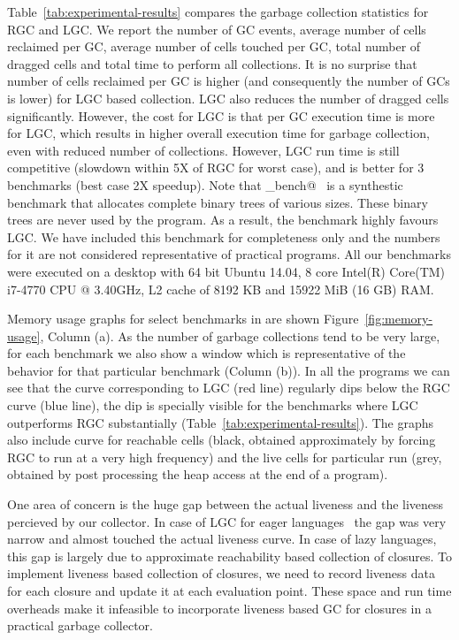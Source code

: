 \documentclass[9pt]{sigplanconf}
\begin{document}
Table~\ref{tab:experimental-results}  compares the  garbage collection
statistics  for RGC  and  LGC.  We  report the  number  of GC  events,
average  number of  cells reclaimed  per GC,  average number  of cells
touched  per GC,  total  number of  dragged cells  and  total time  to
perform  all collections.   It is  no  surprise that  number of  cells
reclaimed per  GC is  higher (and  consequently the  number of  GCs is
lower)  for LGC  based collection.   LGC  also reduces  the number  of
dragged cells significantly. However, the cost  for LGC is that per GC
execution  time is  more  for  LGC, which  results  in higher  overall
execution time  for garbage  collection, even  with reduced  number of
collections.   However, LGC  run time  is still  competitive (slowdown
within 5X of RGC for worst case), and is better for 3 benchmarks (best
case  2X speedup).   Note  that  \verb@gc_bench@~\cite{gc_bench} is  a
synthestic benchmark  that allocates complete binary  trees of various
sizes.  These binary trees are never used by the program. As a result,
the benchmark highly favours LGC.  We have included this benchmark for
completeness  only  and   the  numbers  for  it   are  not  considered
representative of practical programs. All our benchmarks were executed
on  a desktop  with  64 bit  Ubuntu 14.04,  8  core Intel(R)  Core(TM)
i7-4770 CPU @ 3.40GHz, L2 cache of 8192 KB and 15922 MiB (16 GB) RAM.

Memory   usage   graphs   for   select   benchmarks   in   are   shown
Figure~\ref{fig:memory-usage}, Column  (a).  As the number  of garbage
collections tend to  be very large, for each benchmark  we also show a
window which  is representative  of the  behavior for  that particular
benchmark (Column (b)).  In all the programs we can see that the curve
corresponding to  LGC (red  line) regularly dips  below the  RGC curve
(blue line), the dip is specially visible for the benchmarks where LGC
outperforms                      RGC                     substantially
(Table~\ref{tab:experimental-results}). The graphs  also include curve
for reachable cells  (black, obtained approximately by  forcing RGC to
run at  a very high frequency)  and the live cells  for particular run
(grey, obtained  by post processing  the heap access  at the end  of a
program).

One area  of concern is the  huge gap between the  actual liveness and
the liveness  percieved by our  collector.  In  case of LGC  for eager
languages~\cite{asati14lgc} the gap was  very narrow and almost touched
the actual  liveness curve.  In  case of  lazy languages, this  gap is
largely   due  to   approximate  reachability   based  collection   of
closures. To implement liveness based  collection of closures, we need
to  record liveness  data  for  each closure  and  update  it at  each
evaluation  point.   These  space  and  run  time  overheads  make  it
infeasible  to  incorporate  liveness  based  GC  for  closures  in  a
practical garbage collector.
\end{document}
